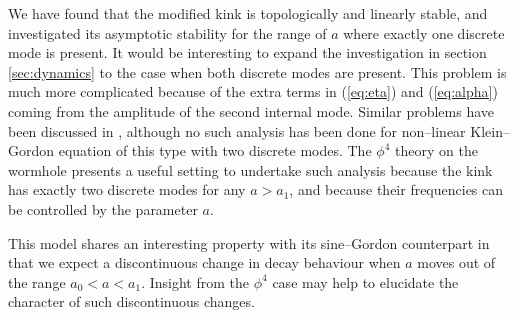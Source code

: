 We have found that the modified kink is topologically and linearly stable, and investigated its asymptotic stability for the range of $a$ where exactly one discrete mode is present. It would be interesting to expand the investigation in section \ref{sec:dynamics} to the case when both discrete modes are present. This problem is much more complicated because of the extra terms in (\ref{eq:eta}) and (\ref{eq:alpha}) coming from the amplitude of the second internal mode. Similar problems have been discussed in \cite{Weinstein}, although no such analysis has been done for non--linear Klein--Gordon equation of this type with two discrete modes. The $\phi^4$ theory on the wormhole presents a useful setting to undertake such analysis because the kink has exactly two discrete modes for any $a>a_1$, and because their frequencies can be controlled by the parameter $a$.

This model shares an interesting property with its sine--Gordon counterpart in that we expect a discontinuous change in decay behaviour when $a$ moves out of the range $a_0<a<a_1$. Insight from the $\phi^4$ case may help to elucidate the character of such discontinuous changes.

 


